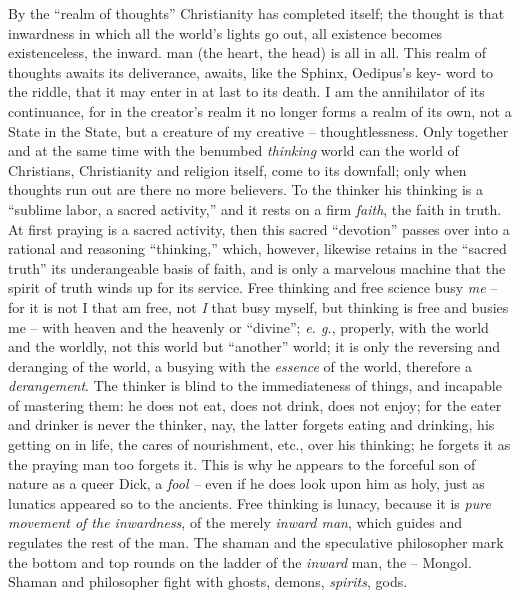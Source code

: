\documentclass[12pt,a4paper]{book}
\begin{document}
By the ``realm of thoughts'' Christianity has completed itself; the thought 
is that inwardness in which all the world's lights go out, all existence 
becomes existenceless, the inward. man (the heart, the head) is all in all. 
This realm of thoughts awaits its deliverance, awaits, like the Sphinx, 
Oedipus's key- word to the riddle, that it may enter in at last to its death. 
I am the annihilator of its continuance, for in the creator's realm it no 
longer forms a realm of its own, not a State in the State, but a creature of 
my creative -- thoughtlessness. Only together and at the same time with the 
benumbed \textit{thinking} world can the world of Christians, Christianity and 
religion itself, come to its downfall; only when thoughts run out are there no 
more believers. To the thinker his thinking is a ``sublime labor, a sacred 
activity,'' and it rests on a firm \textit{faith}, the faith in truth. At 
first praying is a sacred activity, then this sacred ``devotion'' passes 
over into a rational and reasoning ``thinking,'' which, however, likewise 
retains in the ``sacred truth'' its underangeable basis of faith, and is 
only a marvelous machine that the spirit of truth winds up for its service. 
Free thinking and free science busy \textit{me} -- for it is not I that am 
free, not \textit{I} that busy myself, but thinking is free and busies me -- 
with heaven and the heavenly or ``divine''; \textit{e. g.}, properly, with 
the world and the worldly, not this world but ``another'' world; it is only 
the reversing and deranging of the world, a busying with the \textit{essence} 
of the world, therefore a \textit{derangement}. The thinker is blind to the 
immediateness of things, and incapable of mastering them: he does not eat, 
does not drink, does not enjoy; for the eater and drinker is never the 
thinker, nay, the latter forgets eating and drinking, his getting on in life, 
the cares of nourishment, etc., over his thinking; he forgets it as the 
praying man too forgets it. This is why he appears to the forceful son of 
nature as a queer Dick, a \textit{fool --} even if he does look upon him as 
holy, just as lunatics appeared so to the ancients. Free thinking is lunacy, 
because it is \textit{pure movement of the inwardness}, of the merely 
\textit{inward man}, which guides and regulates the rest of the man. The 
shaman and the speculative philosopher mark the bottom and top rounds on the 
ladder of the \textit{inward} man, the -- Mongol. Shaman and philosopher fight 
with ghosts, demons, \textit{spirits}, gods.
\end{document}
